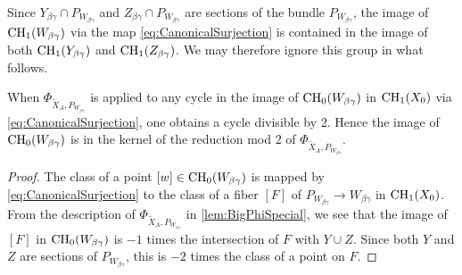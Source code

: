 \begin{observation}
  \label{obs:CH1WAbsorbed}
  Since $Y_{\beta \gamma} \cap P_{W_{\beta \gamma}}$ and $Z_{\beta \gamma} \cap P_{W_{\beta \gamma}}$ are sections of the bundle $P_{W_{\beta \gamma}}$, the image of $\operatorname{CH}_1(W_{\beta \gamma})$ via the map \eqref{eq:CanonicalSurjection} is contained in the image of both $\operatorname{CH}_1(Y_{\beta \gamma})$ and $\operatorname{CH}_1(Z_{\beta \gamma})$. We may therefore ignore this group in what follows.
\end{observation}

\begin{lemma}
  \label{lem:CH0WVanishes}
  When $\Phi_{\widetilde{X}_A,P_{W_{\beta \gamma}}}$ is applied to any cycle in the image of $\operatorname{CH}_0(W_{\beta \gamma})$ in $\operatorname{CH}_1(X_0)$ via \eqref{eq:CanonicalSurjection}, one obtains a cycle divisible by $2$. Hence the image of $\operatorname{CH}_0(W_{\beta \gamma})$ is in the kernel of the reduction mod $2$ of $\Phi_{\widetilde{X}_A,P_{W_{\beta \gamma}}}$.
\end{lemma}
\begin{proof}
  The class of a point $[w] \in \operatorname{CH}_0(W_{\beta \gamma})$ is mapped by \eqref{eq:CanonicalSurjection} to the class of a fiber $[F]$ of $P_{W_{\beta \gamma}} \to W_{\beta \gamma}$ in $\operatorname{CH}_1(X_0)$. From the description of $\Phi_{\widetilde{X}_A,P_{W_{\beta \gamma}}}$ in \cref{lem:BigPhiSpecial}, we see that the image of $[F]$ in $\operatorname{CH}_0(W_{\beta \gamma})$ is $-1$ times the intersection of $F$ with $Y \cup Z$. Since both $Y$ and $Z$ are sections of $P_{W_{\beta \gamma}}$, this is $-2$ times the class of a point on $F$.
\end{proof}

